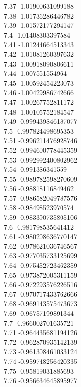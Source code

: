 {7.37	-1.01900631099188\\
7.38	-1.01736286446782\\
7.39	-1.01572177294147\\
7.4	-1.01408303397584\\
7.41	-1.01244664513343\\
7.42	-1.01081260397632\\
7.43	-1.00918090806611\\
7.44	-1.007551554964\\
7.45	-1.00592454223073\\
7.46	-1.00429986742666\\
7.47	-1.00267752811172\\
7.48	-1.00105752184547\\
7.49	-0.999439846187077\\
7.5	-0.997824498695353\\
7.51	-0.996211476928746\\
7.52	-0.994600778445359\\
7.53	-0.992992400802962\\
7.54	-0.991386341559\\
7.55	-0.989782598270609\\
7.56	-0.98818116849462\\
7.57	-0.986582049787576\\
7.58	-0.98498523970574\\
7.59	-0.983390735805106\\
7.6	-0.981798535641412\\
7.61	-0.980208636770147\\
7.62	-0.978621036746567\\
7.63	-0.977035733125699\\
7.64	-0.975452723462359\\
7.65	-0.973872005311159\\
7.66	-0.972293576226516\\
7.67	-0.970717433762666\\
7.68	-0.969143575473673\\
7.69	-0.96757199891344\\
7.7	-0.966002701635721\\
7.71	-0.964435681194126\\
7.72	-0.962870935142139\\
7.73	-0.961308461033124\\
7.74	-0.959748256420335\\
7.75	-0.95819031885693\\
7.76	-0.956634645895977\\
}
